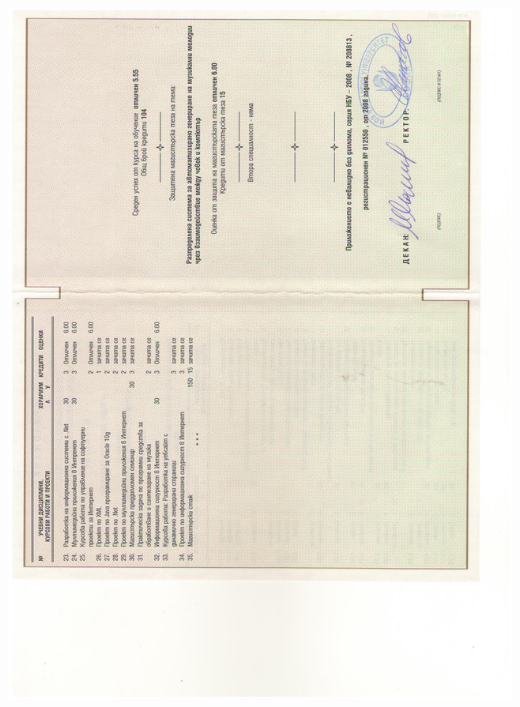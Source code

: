 \documentclass[english,a4paper]{europasscv}
\begin{document}
\includegraphics[width=\textwidth,height=\textheight,keepaspectratio]{DiplomaNBU2008_4}
\end{document}
